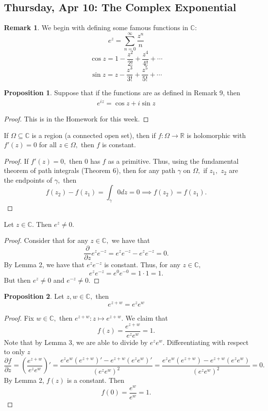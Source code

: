 \documentclass[10pt, oneside]{article}
\newcommand{\bbR}{\mathbb{R}}
\newcommand{\bbC}{\mathbb{C}}
\theoremstyle{definition}
\newtheorem{prop}{Proposition}
\newtheorem{rem}{Remark}
\newcommand{\bbC}{\mathbb{C}}
\newcommand{\bbR}{\mathbb{R}}
\begin{document}
\subsection{Thursday, Apr 10: The Complex Exponential}
\begin{rem}
    We begin with defining some famous functions in $\bbC$:
    \[e^z = \sum_{n=0}^\infty \frac{z^n}{n}\]
    \[\cos z = 1 - \frac{z^2}{2!} + \frac{z^4}{4!} + \cdots\]
    \[\sin z = z - \frac{z^3}{3!} + \frac{z^5}{5!} + \cdots\]
\end{rem}
\begin{prop}
    Suppose that if the functions are as defined in Remark 9, then 
    \begin{align}
        e^{iz} = \cos z + i\sin z
    \end{align}
\end{prop}
\begin{proof}
    This is in the Homework for this week.
\end{proof}
\begin{lemma}
    If $\Omega\subseteq \bbC$ is a region (a connected open set), then if $f: \Omega \to \bbR$ is holomorphic with $f'(z) = 0$ for all $z\in \Omega,$ then $f$ is constant.
\end{lemma}
\begin{proof}
    If $f'(z) = 0,$ then $0$ has $f$ as a primitive. Thus, using the fundamental theorem of path integrals (Theorem 6), then for any path $\gamma$ on $\Omega,$ if $z_1,$ $z_2$ are the endpoints of $\gamma,$ then
    \[f(z_2) - f(z_1) = \int_\gamma 0 dz = 0 \implies f(z_2) = f(z_1).\]
\end{proof}
\begin{lemma}
    Let $z \in \bbC.$ Then $e^z \neq 0.$
\end{lemma}
\begin{proof}
Consider that for any $z\in \bbC,$ we have that
    \[\frac{\partial}{\partial z}e^ze^{-z} = e^ze^{-z} - e^ze^{-z} = 0.\] By Lemma 2, we have that $e^ze^{-z}$ is constant. Thus, for any $z\in \bbC,$
    \[e^ze^{-z} = e^0 e^{-0} = 1 \cdot 1 = 1.\] But then $e^z \neq 0$ and $e^{-z}\neq 0.$ 
\end{proof}
\begin{prop}
Let $z,w \in \bbC,$ then
    \[e^{z + w} = e^z e^w\]
\end{prop}
\begin{proof}
    Fix $w\in \bbC,$ then $e^{z + w}: z\mapsto e^{z + w}.$ We claim that 
    \[f(z)= \frac{e^{z + w}}{e^ze^w}= 1.\] Note that by Lemma 3, we are able to divide by $e^ze^w.$ Differentiating with respect to only $z$ 
    \[\frac{\partial f}{\partial z} = (\frac{e^{z + w}}{e^ze^w})' = \frac{e^ze^w(e^{z + w})' - e^{z + w}(e^{z}e^w)'}{(e^z e^w)^2} = \frac{e^ze^w(e^{z + w}) - e^{z + w}(e^{z}e^w)}{(e^z e^w)^2} = 0.\] By Lemma 2, $f(z)$ is a constant. Then 
    \[f(0) = \frac{e^w}{e^w} = 1.\] 
\end{proof}
\end{document}
